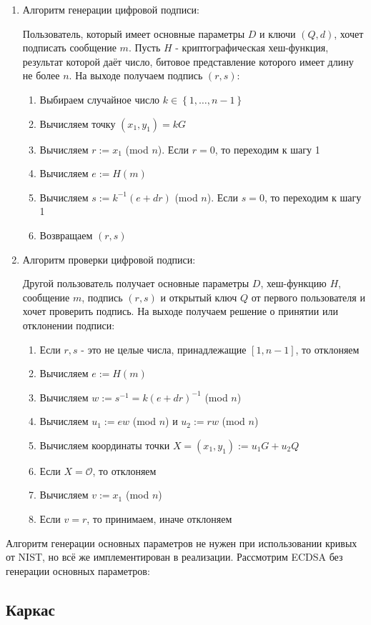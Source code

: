 \begin{enumerate}
      \item Алгоритм генерации цифровой подписи:

      Пользователь, который имеет основные параметры $D$ и ключи $(Q,d)$, хочет подписать сообщение $m$. Пусть $H$ - криптографическая хеш-функция, результат которой даёт число, битовое представление которого имеет длину не более $n$. На выходе получаем подпись $(r,s)$:

      \begin{enumerate}
        \item Выбираем случайное число $k\in \left\{1,\dots,n-1\right\}$
        \item Вычисляем точку $(x_1,y_1)= kG$
        \item Вычисляем $r := x_1$ (mod $n$). Если $r=0$, то переходим к шагу 1
        \item Вычисляем $e := H(m)$
        \item Вычисляем $s := k^{-1}(e+dr)$ (mod $n$). Если $s=0$, то переходим к шагу 1
        \item Возвращаем $(r,s)$
      \end{enumerate}

      \item Алгоритм проверки цифровой подписи:

      Другой пользователь получает основные параметры $D$, хеш-функцию $H$, сообщение $m$, подпись $(r,s)$ и открытый ключ $Q$ от первого пользователя и хочет проверить подпись. На выходе получаем решение о принятии или отклонении подписи:

      \begin{enumerate}
        \item Если $r,s$ - это не целые числа, принадлежащие $[1,n-1]$, то отклоняем
        \item Вычисляем $e:=H(m)$
        \item Вычисляем $w := s^{-1} = k(e+dr)^{-1}$ (mod $n$) 
        \item Вычисляем $u_1:=ew$ (mod $n$) и $u_2:=rw$ (mod $n$)
        \item Вычисляем координаты точки $X=(x_1,y_1):=u_1G+u_2Q$
        \item Если $X=\mathcal{O}$, то отклоняем
        \item Вычисляем $v:=x_1$ (mod $n$)
        \item Если $v = r$, то принимаем, иначе отклоняем
      \end{enumerate}
    \end{enumerate}

Алгоритм генерации основных параметров не нужен при использовании кривых от NIST, но всё же имплементирован в реализации. Рассмотрим ECDSA без генерации основных параметров:
\subsection{Каркас}

